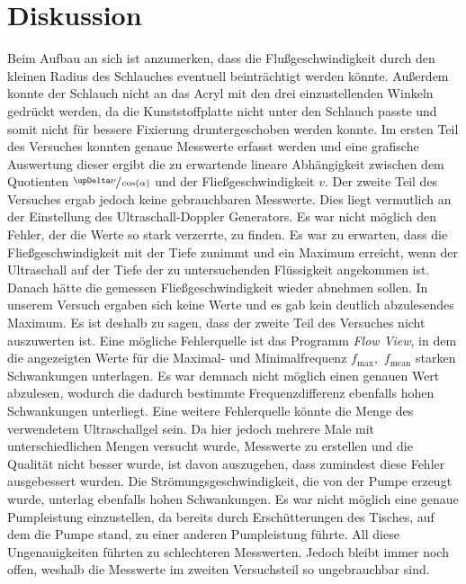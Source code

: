 \section{Diskussion}
\label{sec:Diskussion}

Beim Aufbau an sich ist anzumerken, dass die Flußgeschwindigkeit durch den kleinen Radius des Schlauches eventuell beinträchtigt werden könnte.
Außerdem konnte der Schlauch nicht an das Acryl mit den drei einzustellenden Winkeln gedrückt werden, da die Kunststoffplatte nicht 
unter den Schlauch passte und somit nicht für bessere Fixierung druntergeschoben werden konnte.\newline
Im ersten Teil des Versuches konnten genaue Messwerte erfasst werden und eine grafische Auswertung dieser ergibt die zu erwartende lineare Abhängigkeit
zwischen dem Quotienten $\sfrac{\upDelta\nu}{\cos(\alpha)}$ und der Fließgeschwindigkeit $v$. \newline
Der zweite Teil des Versuches ergab jedoch keine gebrauchbaren Messwerte. Dies liegt vermutlich an der Einstellung des Ultraschall-Doppler Generators.
Es war nicht möglich den Fehler, der die Werte so stark verzerrte, zu finden. Es war zu erwarten, dass die Fließgeschwindigkeit mit der Tiefe zunimmt
und ein Maximum erreicht, wenn der Ultraschall auf der Tiefe der zu untersuchenden Flüssigkeit angekommen ist. Danach hätte die gemessen 
Fließgeschwindigkeit wieder abnehmen sollen.
In unserem Versuch ergaben sich keine Werte und es gab kein deutlich abzulesendes Maximum. Es ist deshalb zu sagen, dass der zweite Teil des Versuches
nicht auszuwerten ist.\newline
Eine mögliche Fehlerquelle ist das Programm \textit{Flow View}, in dem die angezeigten Werte für die Maximal- und Minimalfrequenz $f_{\text{max}},\, \,f_{\text{mean}}$
starken Schwankungen unterlagen. Es war demnach nicht möglich einen genauen Wert abzulesen, wodurch die dadurch bestimmte Frequenzdifferenz ebenfalls
hohen Schwankungen unterliegt.
Eine weitere Fehlerquelle könnte die Menge des verwendetem Ultraschallgel sein. Da hier jedoch mehrere Male mit unterschiedlichen Mengen versucht wurde, Messwerte
zu erstellen und die Qualität nicht besser wurde, ist davon auszugehen, dass zumindest diese Fehler ausgebessert wurden.
Die Strömungsgeschwindigkeit, die von der Pumpe erzeugt wurde, unterlag ebenfalls hohen Schwankungen. Es war nicht möglich eine genaue Pumpleistung
einzustellen, da bereits durch Erschütterungen des Tisches, auf dem die Pumpe stand, zu einer anderen Pumpleistung führte.
All diese Ungenauigkeiten führten zu schlechteren Messwerten. Jedoch bleibt immer noch offen, weshalb die Messwerte im zweiten Versuchsteil so ungebrauchbar sind.